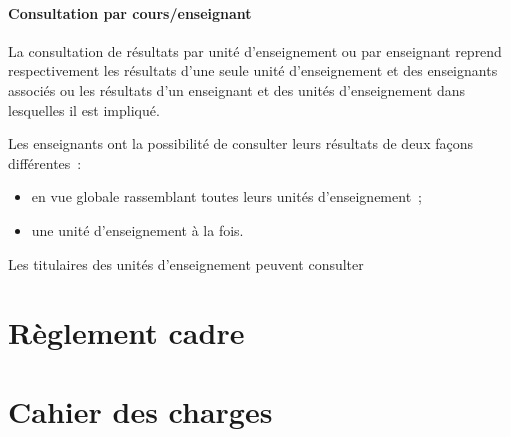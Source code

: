 \documentclass[a4paper,11pt]{report}
\begin{document}
\subsection{Consultation par cours/enseignant}

La consultation de résultats par unité d'enseignement ou par enseignant reprend respectivement les résultats d'une seule unité d'enseignement et des enseignants associés ou les résultats d'un enseignant et des unités d'enseignement dans lesquelles il est impliqué.


Les enseignants ont la possibilité de consulter leurs résultats de deux façons différentes~:
\begin{itemize}
	\item en vue globale rassemblant toutes leurs unités d'enseignement~;
	\item une unité d'enseignement à la fois.
\end{itemize}

Les titulaires des unités d'enseignement peuvent consulter





\appendix
\renewcommand{\partname}{Annexe}
\setcounter{part}{0}%
\part{Règlement cadre}\label{an:regl-cadre}


\part{Cahier des charges}

\end{document}

